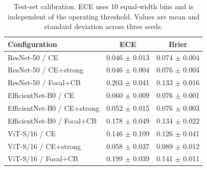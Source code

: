 \begin{table}[t]
\centering
\small
\caption{Test-set calibration. ECE uses 10 equal-width bins and is independent of the operating threshold. Values are mean and standard deviation across three seeds.}
\label{tab:calibration}
\begin{tabular}{lcc}
\toprule
Configuration & ECE & Brier \\
\midrule
ResNet-50 / CE & 0.046 $\pm$ 0.013 & 0.074 $\pm$ 0.004 \\
ResNet-50 / CE+strong & 0.046 $\pm$ 0.004 & 0.076 $\pm$ 0.004 \\
ResNet-50 / Focal+CB & 0.203 $\pm$ 0.041 & 0.133 $\pm$ 0.016 \\
EfficientNet-B0 / CE & 0.060 $\pm$ 0.009 & 0.076 $\pm$ 0.001 \\
EfficientNet-B0 / CE+strong & 0.052 $\pm$ 0.015 & 0.076 $\pm$ 0.003 \\
EfficientNet-B0 / Focal+CB & 0.178 $\pm$ 0.049 & 0.134 $\pm$ 0.022 \\
ViT-S/16 / CE & 0.146 $\pm$ 0.109 & 0.126 $\pm$ 0.041 \\
ViT-S/16 / CE+strong & 0.058 $\pm$ 0.037 & 0.089 $\pm$ 0.012 \\
ViT-S/16 / Focal+CB & 0.199 $\pm$ 0.039 & 0.141 $\pm$ 0.011 \\
\bottomrule
\end{tabular}
\end{table}
